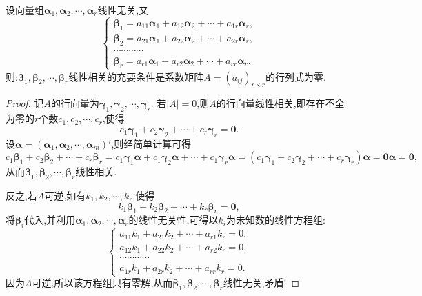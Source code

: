 \documentclass[../../main.tex]{subfiles}
\begin{document}
\begin{proposition}\label{proposition:线性无关向量组的命题5}
设向量组\(\boldsymbol{\alpha}_1,\boldsymbol{\alpha}_2,\cdots,\boldsymbol{\alpha}_r\)线性无关,又
\[
\begin{cases}
\boldsymbol{\beta}_1 = a_{11}\boldsymbol{\alpha}_1 + a_{12}\boldsymbol{\alpha}_2+\cdots + a_{1r}\boldsymbol{\alpha}_r,\\
\boldsymbol{\beta}_2 = a_{21}\boldsymbol{\alpha}_1 + a_{22}\boldsymbol{\alpha}_2+\cdots + a_{2r}\boldsymbol{\alpha}_r,\\
\cdots\cdots\cdots\cdots\\
\boldsymbol{\beta}_r = a_{r1}\boldsymbol{\alpha}_1 + a_{r2}\boldsymbol{\alpha}_2+\cdots + a_{rr}\boldsymbol{\alpha}_r.
\end{cases}
\]
则:\(\boldsymbol{\beta}_1,\boldsymbol{\beta}_2,\cdots,\boldsymbol{\beta}_r\)线性相关的充要条件是系数矩阵\(A=(a_{ij})_{r\times r}\)的行列式为零.
\end{proposition}
\begin{proof}
记\(A\)的行向量为\(\boldsymbol{\gamma}_1,\boldsymbol{\gamma}_2,\cdots,\boldsymbol{\gamma}_r\). 若\(|A| = 0\),则\(A\)的行向量线性相关,即存在不全为零的\(r\)个数\(c_1,c_2,\cdots,c_r\),使得
\[
c_1\boldsymbol{\gamma}_1 + c_2\boldsymbol{\gamma}_2+\cdots + c_r\boldsymbol{\gamma}_r=\boldsymbol{0}.
\]
设$\boldsymbol{\alpha }=\left( \boldsymbol{\alpha }_1,\boldsymbol{\alpha }_2,\cdots ,\boldsymbol{\alpha }_m \right)'$,则经简单计算可得
\[
c_1\boldsymbol{\beta }_1+c_2\boldsymbol{\beta }_2+\cdots +c_r\boldsymbol{\beta }_r=c_1\boldsymbol{\gamma }_1\boldsymbol{\alpha }+c_1\boldsymbol{\gamma }_2\boldsymbol{\alpha }+\cdots +c_1\boldsymbol{\gamma }_r\boldsymbol{\alpha }=\left( c_1\boldsymbol{\gamma }_1+c_2\boldsymbol{\gamma }_2+\cdots +c_r\boldsymbol{\gamma }_r \right) \boldsymbol{\alpha }=\mathbf{0}\boldsymbol{\alpha }=\mathbf{0},
\]
从而\(\boldsymbol{\beta}_1,\boldsymbol{\beta}_2,\cdots,\boldsymbol{\beta}_r\)线性相关.

反之,若\(A\)可逆,如有\(k_1,k_2,\cdots,k_r\),使得
\[
k_1\boldsymbol{\beta}_1 + k_2\boldsymbol{\beta}_2+\cdots + k_r\boldsymbol{\beta}_r=\boldsymbol{0},
\]
将\(\boldsymbol{\beta}_i\)代入,并利用\(\boldsymbol{\alpha}_1,\boldsymbol{\alpha}_2,\cdots,\boldsymbol{\alpha}_r\)的线性无关性,可得以\(k_i\)为未知数的线性方程组:
\[
\begin{cases}
a_{11}k_1 + a_{21}k_2+\cdots + a_{r1}k_r = 0,\\
a_{12}k_1 + a_{22}k_2+\cdots + a_{r2}k_r = 0,\\
\cdots\cdots\cdots\cdots\\
a_{1r}k_1 + a_{2r}k_2+\cdots + a_{rr}k_r = 0.
\end{cases}
\]
因为\(A\)可逆,所以该方程组只有零解,从而\(\boldsymbol{\beta}_1,\boldsymbol{\beta}_2,\cdots,\boldsymbol{\beta}_r\)线性无关,矛盾!
\end{proof}
\end{document}
